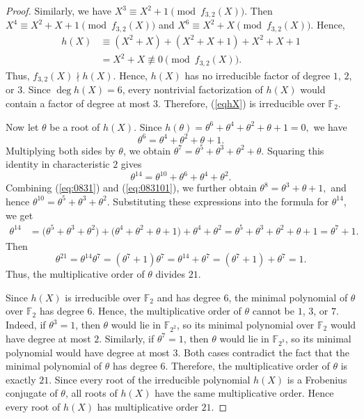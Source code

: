 \documentclass[10pt,a4paper]{amsart}
\begin{document}
\begin{proof}
Similarly, we have
$
X^3\equiv X^2+1 \pmod {f_{3,2}(X)}.
$
Then
$
X^4\equiv X^2+X+1 \pmod {f_{3,2}(X)}
$
and
$
X^6\equiv X^2+X \pmod {f_{3,2}(X)}.
$
Hence,
$$
\begin{aligned}
h(X)
&\equiv
(X^2+X)+(X^2+X+1)+X^2+X+1\\
&=X^2+X
\not\equiv0
\pmod{f_{3,2}(X)}.
\end{aligned}
$$
Thus, \(f_{3,2}(X)\nmid h(X)\). Hence, \(h(X)\) has no irreducible factor of degree \(1\), \(2\), or \(3\). Since \(\deg h(X)=6\), every nontrivial factorization of \(h(X)\) would contain a factor of degree at most \(3\). Therefore, (\ref{eqhX})
is irreducible over \(\mathbb F_2\).


Now let \(\theta\) be a root of \(h(X)\). Since
$
h(\theta)=\theta^6+\theta^4+\theta^2+\theta+1=0,
$
we have
\begin{equation}\label{eq:0831}
\theta^6=\theta^4+\theta^2+\theta+1.
\end{equation}
Multiplying both sides by \(\theta\), we obtain
$
\theta^7=\theta^5+\theta^3+\theta^2+\theta.
$
Squaring this identity in characteristic \(2\) gives
\begin{equation}\label{eq:083101}
\theta^{14}
=
\theta^{10}+\theta^6+\theta^4+\theta^2.
\end{equation}
Combining (\ref{eq:0831}) and (\ref{eq:083101}),
we further obtain
$
\theta^8
=
\theta^3+\theta+1,
$
and hence
$
\theta^{10}
=
\theta^5+\theta^3+\theta^2.
$
Substituting these expressions into the formula for \(\theta^{14}\), we get
$$
\begin{aligned}
\theta^{14}
&=
\bigl(\theta^5+\theta^3+\theta^2\bigr)
+\bigl(\theta^4+\theta^2+\theta+1\bigr)
+\theta^4+\theta^2=
\theta^5+\theta^3+\theta^2+\theta+1=
\theta^7+1.
\end{aligned}
$$
Then
$$
\theta^{21}
=
\theta^{14}\theta^7
=
(\theta^7+1)\theta^7
=
\theta^{14}+\theta^7
=
(\theta^7+1)+\theta^7
=
1.
$$
Thus, the multiplicative order of \(\theta\) divides \(21\).

Since \(h(X)\) is irreducible over \(\mathbb F_2\) and has degree \(6\), the minimal polynomial of \(\theta\) over \(\mathbb F_2\) has degree \(6\). Hence, the multiplicative order of \(\theta\) cannot be \(1\), \(3\), or \(7\). Indeed, if \(\theta^3=1\), then \(\theta\) would lie in \(\mathbb F_{2^2}\), so its minimal polynomial over \(\mathbb F_2\) would have degree at most \(2\). Similarly, if \(\theta^7=1\), then \(\theta\) would lie in \(\mathbb F_{2^3}\), so its minimal polynomial would have degree at most \(3\). Both cases contradict the fact that the minimal polynomial of \(\theta\) has degree \(6\).
Therefore, the multiplicative order of \(\theta\) is exactly
$
21.
$
Since every root of the irreducible polynomial \(h(X)\) is a Frobenius conjugate of \(\theta\), all roots of \(h(X)\) have the same multiplicative order. Hence every root of \(h(X)\) has multiplicative order \(21\).


\end{proof}
\end{document}
